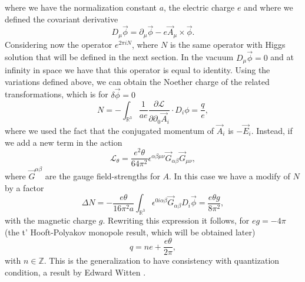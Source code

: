 \documentclass[main.tex]{subfiles}
\begin{document}
where we have the normalization constant $a$, the electric charge $e$ and where we defined the covariant derivative
\begin{equation}
D_\mu\vec\phi=\partial_\mu\vec\phi-e\vec A_\mu\times\vec\phi.
\end{equation}
Considering now the operator $e^{2\pi i N}$, where $N$ is the same operator with Higgs solution that will be defined in the next section. In the vacuum $D_\mu\vec\phi=0$ and at infinity in space we have that this operator is equal to identity. Using the variations defined above, we can obtain the Noether charge of the related transformations, which is for $\delta\vec\phi=0$
\begin{equation}
N=-\int_{\mathbb{R}^3}\frac{1}{ae}\frac{\partial\mathcal{L}}{\partial\partial_0\vec A_i}\cdot D_i\phi=\frac{q}{e},
\end{equation}
where we used the fact that the conjugated momentum of $\vec A_i$ is $-\vec E_i$.
Instead, if we add a new term in the action
\begin{equation}
\mathcal{L}_\theta=\frac{e^2\theta}{64\pi^2}\epsilon^{\alpha\beta\mu\nu}\vec G_{\alpha\beta}\vec G_{\mu\nu},
\end{equation}
where $\vec G^{\alpha\beta}$ are the gauge field-strengths for $A$. In this case we have a modify of $N$ by a factor
\begin{equation}
\Delta N=-\frac{e\theta}{16\pi^2a}\int_{\mathbb{R}^3}\epsilon^{0i\alpha\beta}\vec G_{\alpha\beta}D_i\vec\phi=\frac{e\theta g}{8\pi^2},
\end{equation}
with the magnetic charge $g$. Rewriting this expression it follows, for $eg=-4\pi$ (the t' Hooft-Polyakov monopole result, which will be obtained later)\begin{equation}
q=ne+\frac{e\theta}{2\pi},
\end{equation}
with $n\in\mathbb{Z}$. This is the generalization to have consistency with quantization condition, a result by Edward Witten \cite{Witten}.
\end{document}
